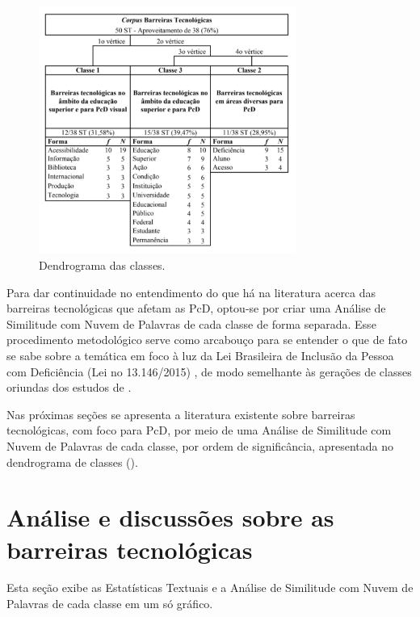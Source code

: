 \documentclass{textolivre}
\begin{document}
\begin{figure}[htbp]
 \centering
 \includegraphics[width=0.75\textwidth]{fig1-32563.png}
 \caption{Dendrograma das classes.}
 \label{fig1}
\end{figure}

Para dar continuidade no entendimento do que há na literatura acerca das barreiras tecnológicas que afetam as PcD, optou-se por criar uma Análise de Similitude com Nuvem de Palavras de cada classe de forma separada. Esse procedimento metodológico serve como arcabouço para se entender o que de fato se sabe sobre a temática em foco à luz da Lei Brasileira de Inclusão da Pessoa com Deficiência (Lei no 13.146/2015) \cite{brasil_lei_2015}, de modo semelhante às gerações de classes oriundas dos estudos de \textcite{machado2016, pereira2020}.

Nas próximas seções se apresenta a literatura existente sobre barreiras tecnológicas, com foco para PcD, por meio de uma Análise de Similitude com Nuvem de Palavras de cada classe, por ordem de significância, apresentada no dendrograma de classes ().

\section{Análise e discussões sobre as barreiras tecnológicas}
Esta seção exibe as Estatísticas Textuais e a Análise de Similitude com Nuvem de Palavras de cada classe em um só gráfico.
\end{document}

